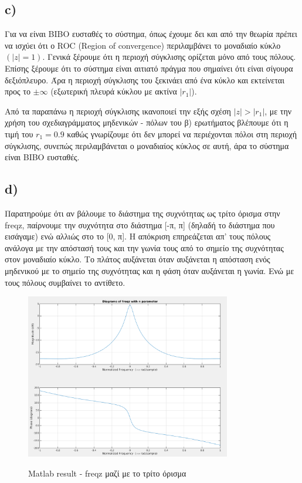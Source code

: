 \documentclass[11pt]{article}
\begin{document}
\subsection*{c)} 
Για να είναι BIBO ευσταθές το σύστημα, όπως έχουμε δει και από την θεωρία πρέπει να ισχύει ότι ο ROC (Region of convergence) περιλαμβάνει το μοναδιαίο κύκλο $(|z|=1)$. Γενικά ξέρουμε ότι η περιοχή σύγκλισης ορίζεται μόνο από τους πόλους. Επίσης ξέρουμε ότι το σύστημα είναι αιτιατό πράγμα που σημαίνει ότι είναι σίγουρα δεξιόπλευρο. Άρα η περιοχή σύγκλισης του ξεκινάει από ένα κύκλο και εκτείνεται προς το $\pm \infty$ (εξωτερική πλευρά κύκλου με ακτίνα $|r_1|$). 
\par \noindent
Από τα παραπάνω η περιοχή σύγκλισης ικανοποιεί την εξής σχέση $|z|>|r_1|$, με την χρήση του σχεδιαγράμματος μηδενικών - πόλων του β) ερωτήματος βλέπουμε ότι η τιμή του $r_1=0.9$ καθώς γνωρίζουμε ότι δεν μπορεί να περιέχονται πόλοι στη περιοχή σύγκλισης, συνεπώς περιλαμβάνεται ο μοναδιαίος κύκλος σε αυτή, άρα το σύστημα είναι BIBO ευσταθές.

\subsection*{d)}
Παρατηρούμε ότι αν βάλουμε το διάστημα της συχνότητας ως τρίτο όρισμα στην freqz, παίρνουμε την συχνότητα στο διάστημα [-π, π] (δηλαδή το διάστημα που εισάγαμε) ενώ αλλιώς στο το [0, π]. Η απόκριση επηρεάζεται απ’ τους πόλους ανάλογα με την απόστασή τους και την γωνία τους από το σημείο της συχνότητας στον μοναδιαίο κύκλο. Το πλάτος αυξάνεται όταν αυξάνεται η απόσταση ενός μηδενικού με το σημείο της συχνότητας και η φάση όταν αυξάνεται η γωνία. Ενώ με τους πόλους συμβαίνει το αντίθετο.

\begin{figure}[H]
    \centering
   \includegraphics[scale=0.5, width=0.8\textwidth]{photos/1d-freqz-with_n.png} \\
    \caption{Matlab result - freqz μαζί με το τρίτο όρισμα}
\end{figure}
\end{document}
